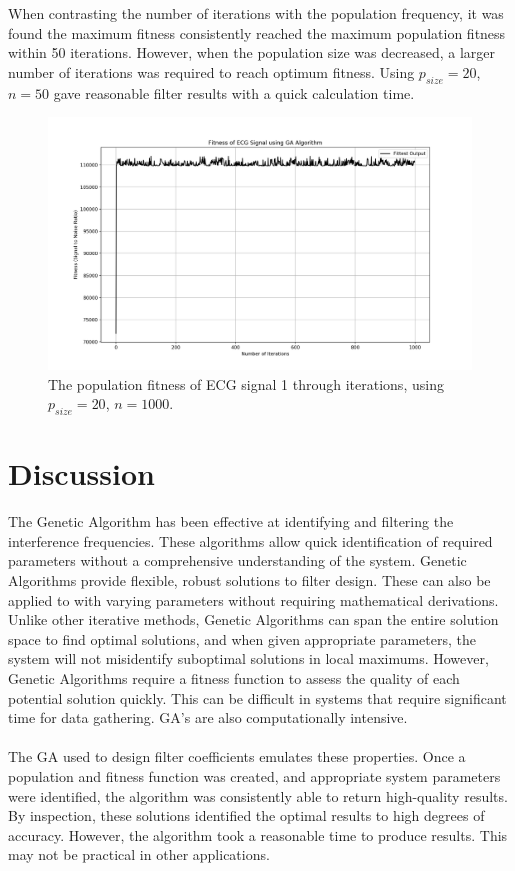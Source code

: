 \documentclass[a4paper, 11pt]{article}
\begin{document}
    When contrasting the number of iterations with the population frequency, it was found the maximum fitness consistently reached 
    the maximum population fitness within 50 iterations. However, when the population size was decreased, a larger number of
    iterations was required to reach optimum fitness. Using $p_{size} = 20$, $n = 50$ gave reasonable filter results with a
    quick calculation time.

    \begin{figure}[h!]
        \centering
        \graphicspath{{./wiki/}}
        \includegraphics[scale=0.5]{1kGen20Pop.png}
        \caption{The population fitness of ECG signal 1 through iterations, using $p_{size} = 20$, $n = 1000$.}
        \label{Fig:result_2}
    \end{figure}

\section{Discussion}\label{sec:dis}
    The Genetic Algorithm has been effective at identifying and filtering the interference frequencies. These algorithms 
    allow quick identification of required parameters without a comprehensive understanding of the system. Genetic Algorithms 
    provide flexible, robust solutions to filter design. These can also be applied to with varying parameters without requiring
    mathematical derivations. Unlike other iterative methods, Genetic Algorithms can span the entire solution space to find
    optimal solutions, and when given appropriate parameters, the system will not misidentify suboptimal solutions in local
    maximums. However, Genetic Algorithms require a fitness function to assess the quality of each potential solution quickly. 
    This can be difficult in systems that require significant time for data gathering. GA's are also computationally intensive.
    \\\\
    The GA used to design filter coefficients emulates these properties. Once a population and fitness function was created,
    and appropriate system parameters were identified, the algorithm was consistently able to return high-quality results. 
    By inspection, these solutions identified the optimal results to high degrees of accuracy. However, the algorithm took
    a reasonable time to produce results. This may not be practical in other applications. 
    
\end{document}

